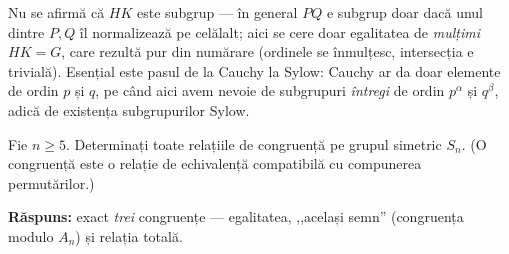 \begin{obs}
Nu se afirmă că $HK$ este subgrup --- în general $PQ$ e subgrup
doar dacă unul dintre $P,Q$ îl normalizează pe celălalt; aici
se cere doar egalitatea de \emph{mulțimi} $HK=G$, care rezultă
pur din numărare (ordinele se înmulțesc, intersecția e
trivială). Esențial este pasul de la Cauchy la Sylow: Cauchy ar da
doar elemente de ordin $p$ și $q$, pe când aici avem nevoie de
subgrupuri \emph{întregi} de ordin $p^{\alpha}$ și $q^{\beta}$, adică
de existența subgrupurilor Sylow.
\end{obs}

\begin{problema}
Fie $n\ge 5$. Determinați toate relațiile de congruență pe
grupul simetric $S_{n}$. (O congruență este o relație de
echivalență compatibilă cu compunerea permutărilor.)
\end{problema}

\noindent\textbf{Răspuns:} exact \emph{trei} congruențe --- egalitatea,
,,același semn'' (congruența modulo $A_{n}$) și relația
totală.

